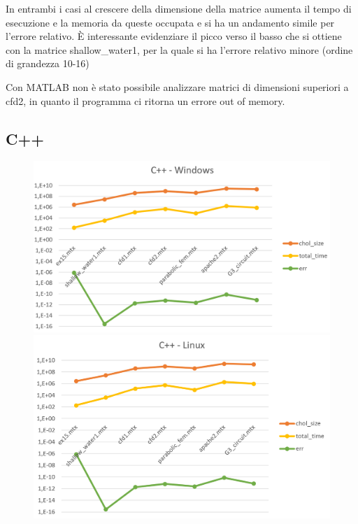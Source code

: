 \documentclass[a4paper,10pt]{article}
\begin{document}
In entrambi i casi al crescere della dimensione della matrice aumenta il tempo di esecuzione e la memoria da queste occupata e si ha un andamento simile per l’errore relativo. È interessante evidenziare il picco verso il basso che si ottiene con la matrice shallow\_water1, per la quale si ha l’errore relativo minore (ordine di grandezza 10-16)

Con MATLAB non è stato possibile analizzare matrici di dimensioni superiori a cfd2, in quanto il programma ci ritorna un errore out of memory. 

\subsection{C++}

\begin{figure}[H]
\centering
\begin{minipage}{.6\textwidth}
  \centering
  \includegraphics[width=1\linewidth]{img/c++win.png}
\end{minipage}%
\begin{minipage}{.6\textwidth}
  \centering
  \includegraphics[width=1\linewidth]{img/c++linux.png}
\end{minipage}
\end{figure}
\end{document}
